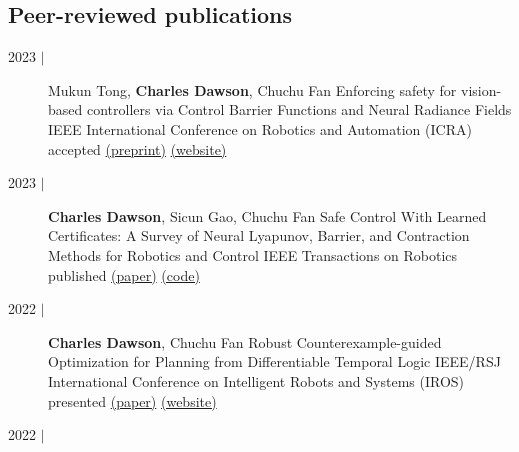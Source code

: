 \documentclass{cv_style}
\newcommand{\me}{\textbf{Charles Dawson}}
\begin{document}
    \subsection{Peer-reviewed publications}
        \begin{description}
            \item[2023 $\vert$]
                    {Mukun Tong, \me, Chuchu Fan}
                    {Enforcing safety for vision-based controllers via Control Barrier Functions and Neural Radiance Fields}
                    {IEEE International Conference on Robotics and Automation (ICRA)}
                    {accepted}
                    {
                        \href{https://arxiv.org/abs/2209.12266}{(preprint)}
                        \href{https://mit-realm.github.io/nerf-cbf/}{(website)}
                    }
            \item[2023 $\vert$]
                    {\me, Sicun Gao, Chuchu Fan}
                    {Safe Control With Learned Certificates: A Survey of Neural Lyapunov, Barrier, and Contraction Methods for Robotics and Control}
                    {IEEE Transactions on Robotics}
                    {published}
                    {
                        \href{https://ieeexplore.ieee.org/abstract/document/10015199}{(paper)}
                        \href{https://github.com/MIT-REALM/neural_clbf}{(code)}
                    }
            \item[2022 $\vert$]
                    {\me, Chuchu Fan}
                    {Robust Counterexample-guided Optimization for Planning from Differentiable Temporal Logic}
                    {IEEE/RSJ International Conference on Intelligent Robots and Systems (IROS)}
                    {presented}
                    {
                        \href{https://ieeexplore.ieee.org/abstract/document/9981382}{(paper)}
                        \href{https://mit-realm.github.io/architect-iros2022/}{(website)}
                    }
            \item[2022 $\vert$]

\end{description}
\end{document}
